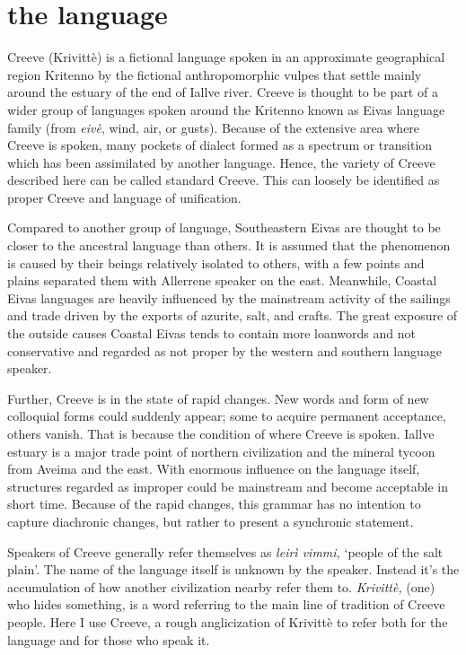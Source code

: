 \section{the language}
Creeve (Krivittè) is a fictional language spoken in an approximate geographical region Kritenno by the fictional anthropomorphic vulpes that settle mainly around the estuary of the end of Iallve river. Creeve is thought to be part of a wider group of languages spoken around the Kritenno known as Eivas language family (from \emph{eivè}, wind, air, or gusts). Because of the extensive area where Creeve is spoken, many pockets of dialect formed as a spectrum or transition which has been assimilated by another language. Hence, the variety of Creeve described here can be called standard Creeve. This can loosely be identified as proper Creeve and language of unification.

Compared to another group of language, Southeastern Eivas are thought to be closer to the ancestral language than others. It is assumed that the phenomenon is caused by their beings relatively isolated to others, with a few points and plains separated them with Allerrene speaker on the east. Meanwhile, Coastal Eivas languages are heavily influenced by the mainstream activity of the sailings and trade driven by the exports of azurite, salt, and crafts. The great exposure of the outside causes Coastal Eivas tends to contain more loanwords and not conservative and regarded as not proper by the western and southern language speaker.

Further, Creeve is in the state of rapid changes. New words and form of new colloquial forms could suddenly appear; some to acquire permanent acceptance, others vanish. That is because the condition of where Creeve is spoken. Iallve estuary is a major trade point of northern civilization and the mineral tycoon from Aveima and the east. With enormous influence on the language itself, structures regarded as improper could be mainstream and become acceptable in short time. Because of the rapid changes, this grammar has no intention to capture diachronic changes, but rather to present a synchronic statement.

Speakers of Creeve generally refer themselves as \emph{leirì vimmi,} `people of the salt plain'. The name of the language itself is unknown by the speaker. Instead it's the accumulation of how another civilization nearby refer them to. \emph{Krivittè,} (one) who hides something, is a word referring to the main line of tradition of Creeve people. Here I use Creeve, a rough anglicization of Krivittè to refer both for the language and for those who speak it.


